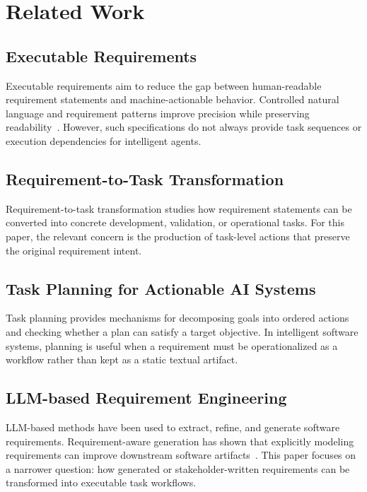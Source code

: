 \section{Related Work}
\label{related_work}

\subsection{Executable Requirements}
\label{sec:rw-executable}

Executable requirements aim to reduce the gap between human-readable requirement statements and machine-actionable behavior.
Controlled natural language and requirement patterns improve precision while preserving readability~\cite{darifControlledNaturalLanguage2026}.
However, such specifications do not always provide task sequences or execution dependencies for intelligent agents.

\subsection{Requirement-to-Task Transformation}
\label{sec:rw-req-task}

Requirement-to-task transformation studies how requirement statements can be converted into concrete development, validation, or operational tasks.
For this paper, the relevant concern is the production of task-level actions that preserve the original requirement intent.

\subsection{Task Planning for Actionable AI Systems}
\label{sec:rw-task-planning}

Task planning provides mechanisms for decomposing goals into ordered actions and checking whether a plan can satisfy a target objective.
In intelligent software systems, planning is useful when a requirement must be operationalized as a workflow rather than kept as a static textual artifact.

\subsection{LLM-based Requirement Engineering}
\label{sec:rw-llm-re}

LLM-based methods have been used to extract, refine, and generate software requirements.
Requirement-aware generation has shown that explicitly modeling requirements can improve downstream software artifacts~\cite{hanArchCodeIncorporatingSoftware2024}.
This paper focuses on a narrower question: how generated or stakeholder-written requirements can be transformed into executable task workflows.

